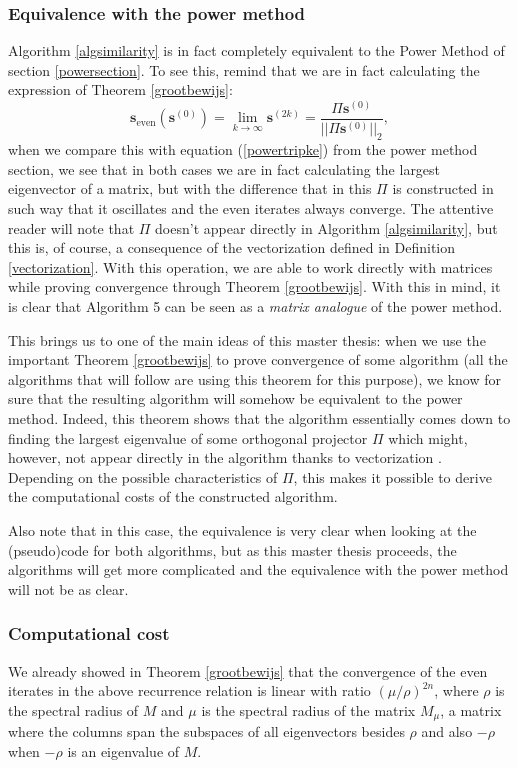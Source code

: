 \documentclass[a4paper,11pt]{report}
\begin{document}
\subsubsection{Equivalence with the power method}
Algorithm \ref{algsimilarity} is in fact completely equivalent to the Power 
Method of section \ref{powersection}. To see this, remind that we are in fact 
calculating the expression of Theorem \ref{grootbewijs}:
$$\mathbf{s}_{\text{even}}(\mathbf{s}^{(0)}) = \lim_{k \to \infty} \mathbf{s}^{(2k)}  = \frac{\Pi \mathbf{s}^{(0)}}{||\Pi \mathbf{s}^{(0)}||_2},$$
when we compare 
this with equation (\ref{powertripke}) from the power method section, we see 
that in both cases we are in fact calculating the largest eigenvector of a matrix, but with the difference 
that in this $\Pi$ is constructed in such way that it oscillates and the even 
iterates always converge. The attentive reader will note that $\Pi$ doesn't 
appear directly in Algorithm \ref{algsimilarity}, but this is, of course, a 
consequence of the vectorization defined in Definition \ref{vectorization}. With 
this operation, we are able to work directly with matrices while proving 
convergence through Theorem \ref{grootbewijs}. With this in mind, it is clear 
that Algorithm 5 can be seen as a \textit{matrix analogue} of the power method.

This brings us to one of the main ideas of this master thesis: when we use the important Theorem \ref{grootbewijs} 
to prove convergence of some algorithm (all the algorithms that will follow are using this 
theorem for this purpose), we know for sure that the resulting algorithm will somehow be equivalent to the power method. 
Indeed, this theorem shows that the algorithm essentially comes down to 
finding the largest eigenvalue of some orthogonal projector $\Pi$ which might, however, not appear
directly in the algorithm thanks to vectorization . Depending on the possible characteristics of $\Pi$, this makes it 
possible to derive the computational costs of the constructed algorithm. 

Also 
note that in this case, the equivalence is very clear when looking at the (pseudo)code for both algorithms, but as this master thesis 
proceeds, the algorithms will get more complicated and the equivalence with the 
power method will not be as clear.

\subsubsection{Computational cost}
 We 
already showed in Theorem \ref{grootbewijs} that the convergence of the even 
iterates in the above recurrence relation is linear with ratio $(\mu/\rho)^{2n}$, where $\rho$ is the spectral radius
of $M$ and $\mu$ is the spectral radius
of the matrix $M_\mu$, a matrix where the columns span the subspaces of all 
eigenvectors besides $\rho$ and also $-\rho$ when $-\rho$ is an eigenvalue of $M$.
\end{document}

